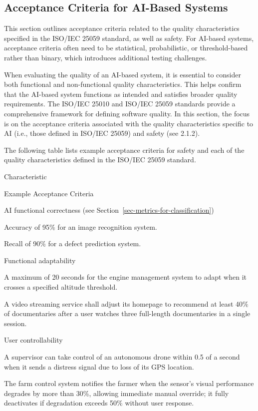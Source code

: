 \documentclass[
  letterpaper,
  DIV=11,
  numbers=noendperiod,
  oneside]{scrreprt}
\begin{document}
\begin{tcolorbox}
\section{Acceptance Criteria for AI-Based
Systems}\label{acceptance-criteria-for-ai-based-systems}

This section outlines acceptance criteria related to the quality
characteristics specified in the ISO/IEC 25059 standard, as well as
safety. For AI-based systems, acceptance criteria often need to be
statistical, probabilistic, or threshold-based rather than binary, which
introduces additional testing challenges.

When evaluating the quality of an AI-based system, it is essential to
consider both functional and non-functional quality characteristics.
This helps confirm that the AI-based system functions as intended and
satisfies broader quality requirements. The ISO/IEC 25010 and ISO/IEC
25059 standards provide a comprehensive framework for defining software
quality. In this section, the focus is on the acceptance criteria
associated with the quality characteristics specific to AI (i.e., those
defined in ISO/IEC 25059) and safety (see 2.1.2).

The following table lists example acceptance criteria for safety and
each of the quality characteristics defined in the ISO/IEC 25059
standard.

Characteristic

Example Acceptance Criteria

AI functional correctness{} (see
Section~\ref{sec-metrics-for-classification})

Accuracy of 95\% for an image recognition system.

Recall of 90\% for a defect prediction system.

Functional adaptability{}

A maximum of 20 seconds for the engine management system to adapt when
it crosses a specified altitude threshold.

A video streaming service shall adjust its homepage to recommend at
least 40\% of documentaries after a user watches three full-length
documentaries in a single session.

User controllability{}

A supervisor can take control of an autonomous drone within 0.5 of a
second when it sends a distress signal due to loss of its GPS location.

The farm control system notifies the farmer when the sensor's visual
performance degrades by more than 30\%, allowing immediate manual
override; it fully deactivates if degradation exceeds 50\% without user
response.


\end{tcolorbox}
\end{document}
